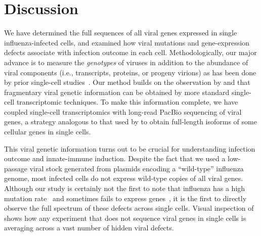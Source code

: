\documentclass[9pt,lineno]{elife}
\begin{document}
\section{Discussion}
We have determined the full sequences of all viral genes expressed in single influenza-infected cells, and examined how viral mutations and gene-expression defects associate with infection outcome in each cell.
Methodologically, our major advance is to measure the \emph{genotypes} of viruses in addition to the abundance of viral components (i.e., transcripts, proteins, or progeny virions) as has been done by prior single-cell studies~\citep{russell2018extreme, zanini2018single, zanini2018virus, steuerman2018dissection, saikia2018simultaneous, oneal2018west, zhu2009growth, schulte2014single, akpinar2016high, heldt2015single, brooke2013most}.
Our method builds on the observation by \citet{saikia2018simultaneous} and \citet{zanini2018virus} that fragmentary viral genetic information can be obtained by more standard single-cell transcriptomic techniques.
To make this information complete, we have coupled single-cell transcriptomics with long-read PacBio sequencing of viral genes, a strategy analogous to that used by \cite{gupta2018single} to obtain full-length isoforms of some cellular genes in single cells.

This viral genetic information turns out to be crucial for understanding infection outcome and innate-immune induction.
Despite the fact that we used a low-passage viral stock generated from plasmids encoding a ``wild-type'' influenza genome, most infected cells do not express wild-type copies of all viral genes.
Although our study is certainly not the first to note that influenza has a high mutation rate~\citep{parvin1986measurement, suarez1992heterogeneity, suarez1994estimation, bloom2014experimentally, pauly2017novel} and sometimes fails to express genes~\citep{brooke2013most, heldt2015single, dou2017analysis, russell2018extreme}, it is the first to directly observe the full spectrum of these defects across single cells.
Visual inspection of  shows how any experiment that does not sequence viral genes in single cells is averaging across a vast number of hidden viral defects.
\end{document}
